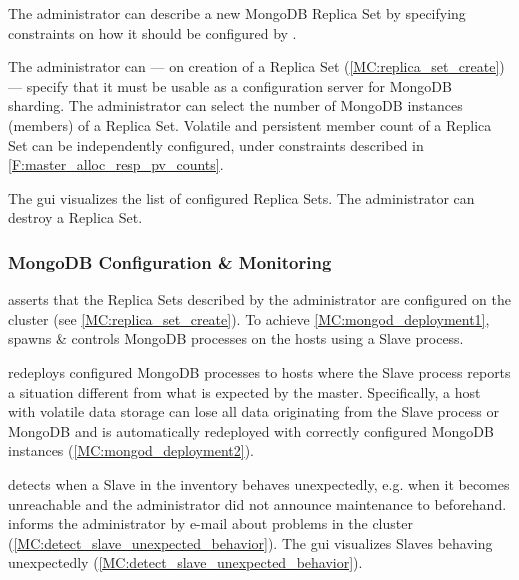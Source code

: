 \begin{description}
	 The administrator can describe a new MongoDB Replica Set by specifying constraints on 
	how it should be configured by \mamid. \done
	\begin{description}
		 The administrator can --- on creation of a Replica Set 
		(\ref{MC:replica_set_create}) --- specify that it must be usable as a configuration server for MongoDB sharding. 
		\done
		 The administrator can select the number of MongoDB instances (members) of a 
		Replica Set. \done
		 Volatile and persistent member count of a Replica Set can be independently 
		configured, under constraints described in \ref{F:master_alloc_resp_pv_counts}. \done
	\end{description}
	 The gui visualizes the list of configured Replica Sets. \done
	 The administrator can destroy a Replica Set. \done
	
\end{description}

\subsubsection{MongoDB Configuration \& Monitoring}
\begin{description}
	 \mamid asserts that the Replica Sets described by the administrator are configured on the cluster 
	(see \ref{MC:replica_set_create}). \done
	 To achieve \ref{MC:mongod_deployment1}, \mamid spawns \& controls MongoDB processes on the hosts 
	using a Slave process. \done
	\begin{description}
		 \mamid redeploys configured MongoDB processes to hosts where the Slave process reports 
		a situation different from what is expected by the master. \done
		 Specifically, a host with volatile data storage can lose all data originating 
		from the Slave process or MongoDB and is automatically redeployed with correctly configured MongoDB instances 
		(\ref{MC:mongod_deployment2}). \done
	\end{description}
	
	 \mamid detects when a Slave in the inventory behaves unexpectedly, e.g. when 
	it becomes unreachable and the administrator did not announce maintenance to \mamid beforehand. \done
	 \mamid informs the administrator by e-mail about problems in the cluster 
	(\ref{MC:detect_slave_unexpected_behavior}). \done
	 The gui visualizes Slaves behaving unexpectedly (\ref{MC:detect_slave_unexpected_behavior}). \done
\end{description}

